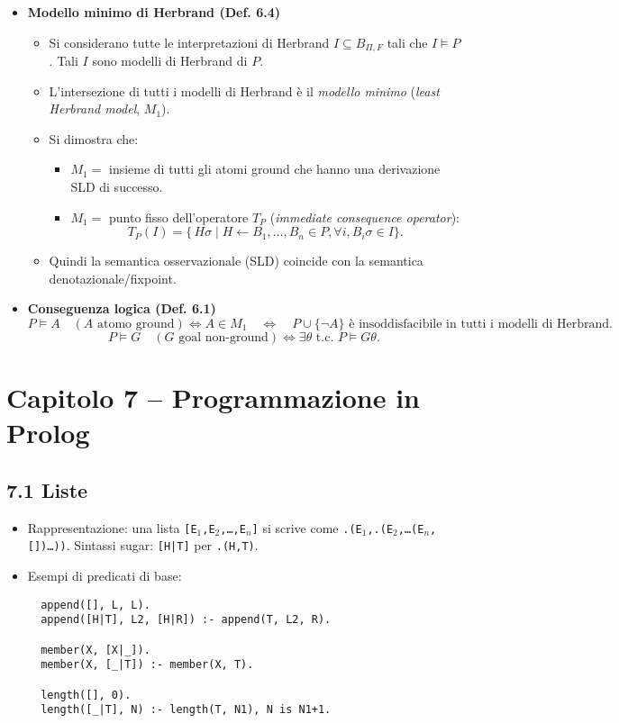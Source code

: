 \documentclass[12pt]{article}
\begin{document}
\begin{itemize}
  \item \textbf{Modello minimo di Herbrand (Def. 6.4)}\\
    \begin{itemize}
      \item Si considerano tutte le interpretazioni di Herbrand $I \subseteq B_{\Pi,F}$ tali che $I \models P$. Tali $I$ sono modelli di Herbrand di $P$.
      \item L’intersezione di tutti i modelli di Herbrand è il \emph{modello minimo} (\emph{least Herbrand model}, $M_1$).
      \item Si dimostra che:
      \begin{itemize}
        \item $M_1 =$ insieme di tutti gli atomi ground che hanno una derivazione SLD di successo.
        \item $M_1 =$ punto fisso dell’operatore $T_P$ (\emph{immediate consequence operator}): 
        \[
          T_P(I) = \{\, H\sigma \mid H \leftarrow B_1,\dots,B_n \in P, \forall i, B_i\sigma \in I \}.
        \]
      \end{itemize}
      \item Quindi la semantica osservazionale (SLD) coincide con la semantica denotazionale/fixpoint.
    \end{itemize}

  \item \textbf{Conseguenza logica (Def. 6.1)}\\
    \[
      P \models A \quad (A\text{ atomo ground}) \iff A \in M_1
      \quad\iff\quad P \cup \{\neg A\} \text{ è insoddisfacibile in tutti i modelli di Herbrand.}
    \]
    \[
      P \models G \quad (G\text{ goal non-ground}) \iff \exists \theta \text{ t.c. } P \models G\theta.
    \]
\end{itemize}

\section*{Capitolo 7 – Programmazione in Prolog}

\subsection*{7.1 Liste}

\begin{itemize}
  \item Rappresentazione: una lista \texttt{[E$_1$,E$_2$,…,E$_n$]} si scrive come \texttt{.(E$_1$,.(E$_2$,…(E$_n$,[])\dots))}. Sintassi sugar: \texttt{[H|T]} per \texttt{.(H,T)}.
  \item Esempi di predicati di base:
  \begin{verbatim}
  append([], L, L).
  append([H|T], L2, [H|R]) :- append(T, L2, R).

  member(X, [X|_]).
  member(X, [_|T]) :- member(X, T).

  length([], 0).
  length([_|T], N) :- length(T, N1), N is N1+1.
  \end{verbatim}
\end{itemize}
\end{document}
